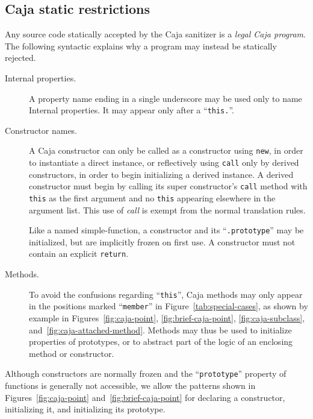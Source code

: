 \documentclass[letterpaper,twocolumn,10pt]{article}
\newcommand{\code}[1]{{\tt {#1}}}              %
\begin{document}
\subsection{Caja static restrictions}
\label{subsec:caja-static}

Any source code statically accepted by the Caja sanitizer is a \emph{legal 
Caja program}. The following syntactic explains why a program may instead be statically rejected.

\begin{description}

  \item[Internal properties.] A property name ending in a single underscore may 
  be used only to name Internal properties. It may appear only after a 
  ``\code{this.}''.
  
  \item[Constructor names.] A Caja constructor can only be called as a 
  constructor using \code{new}, in order to instantiate a direct instance, 
  or reflectively using \code{call} only by derived constructors, in order to begin 
  initializing a derived instance. A derived constructor must begin by 
  calling its super constructor's \code{call} method with \code{this} as the 
  first argument and no \code{this} appearing elsewhere in the argument list. 
  This use of \emph{call} is exempt from the normal translation rules.
  
  Like a named simple-function, a constructor and its ``\code{.prototype}'' 
  may be initialized, but are implicitly frozen on first use. A constructor 
  must not contain an explicit \code{return}.
  
  \item[Methods.] To avoid the confusions regarding ``\code{this}'', Caja 
  methods may only appear in the positions marked ``\code{member}'' in 
  Figure~\ref{tab:special-cases}, as shown by example in 
  Figures~\ref{fig:caja-point}, \ref{fig:brief-caja-point}, 
  \ref{fig:caja-subclass}, and~\ref{fig:caja-attached-method}. Methods may 
  thus be used to initialize properties of prototypes, or to abstract part of 
  the logic of an enclosing method or constructor.
  
\end{description}

Although constructors are normally frozen and the ``\code{prototype}'' 
property of functions is generally not accessible, we allow the 
patterns shown in Figures~\ref{fig:caja-point} and~\ref{fig:brief-caja-point} 
for declaring a constructor, initializing it, and initializing its prototype.
\end{document}
